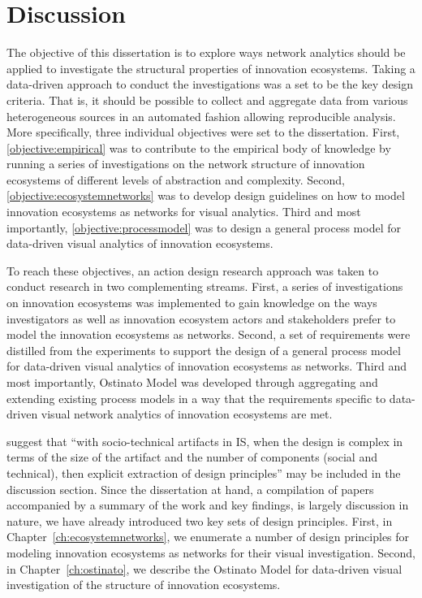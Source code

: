\chapter{Discussion}
\label{ch:discussion}

The objective of this dissertation is to explore ways network analytics should be applied to investigate the structural properties of innovation ecosystems. Taking a data-driven approach to conduct the investigations was a set to be the key design criteria. That is, it should be possible to collect and aggregate data from various heterogeneous sources in an automated fashion allowing reproducible analysis. More specifically, three individual objectives were set to the dissertation. First, \ref{objective:empirical} was to contribute to the empirical body of knowledge by running a series of investigations on the network structure of innovation ecosystems of different levels of abstraction and complexity. Second, \ref{objective:ecosystemnetworks} was to develop design guidelines on how to model innovation ecosystems as networks for visual analytics. Third and most importantly, \ref{objective:processmodel} was to design a general process model for data-driven visual analytics of innovation ecosystems.

To reach these objectives, an action design research approach was taken to conduct research in two complementing streams. First, a series of investigations on innovation ecosystems was implemented to gain knowledge on the ways investigators as well as innovation ecosystem actors and stakeholders prefer to model the innovation ecosystems as networks. Second, a set of requirements were distilled from the experiments to support the design of a general process model for data-driven visual analytics of innovation ecosystems as networks. Third and most importantly, Ostinato Model was developed through aggregating and extending existing process models in a way that the requirements specific to data-driven visual network analytics of innovation ecosystems are met.

\cite{Gregor2013PositioningImpact} suggest that ``with socio-technical artifacts in IS, when the design is complex in terms of the size of the artifact and the number of components (social and technical), then explicit extraction of design principles'' may be included in the discussion section. Since the dissertation at hand, a compilation of papers accompanied by a summary of the work and key findings, is largely discussion in nature, we have already introduced two key sets of design principles. First, in Chapter~\ref{ch:ecosystemnetworks}, we enumerate a number of design principles for modeling innovation ecosystems as networks for their visual investigation. Second, in Chapter~\ref{ch:ostinato}, we describe the Ostinato Model for data-driven visual investigation of the structure of innovation ecosystems.

